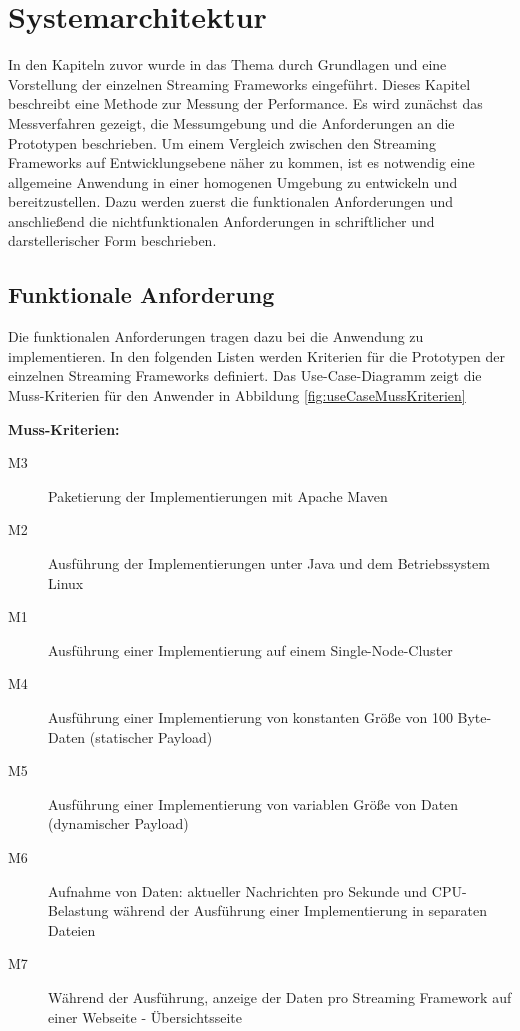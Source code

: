 \chapter{Systemarchitektur}
\label{chapter:systemarchitekur}

In den Kapiteln zuvor wurde in das Thema durch Grundlagen und eine Vorstellung der einzelnen Streaming Frameworks eingeführt. Dieses Kapitel beschreibt eine Methode zur Messung der Performance. Es wird zunächst das Messverfahren gezeigt, die Messumgebung und die Anforderungen an die Prototypen beschrieben. Um einem Vergleich zwischen den Streaming Frameworks auf Entwicklungsebene näher zu kommen, ist es notwendig eine allgemeine Anwendung in einer homogenen Umgebung zu entwickeln und bereitzustellen. Dazu werden zuerst die funktionalen Anforderungen und anschließend die nichtfunktionalen Anforderungen in schriftlicher und darstellerischer Form beschrieben.

\section{Funktionale Anforderung}
\label{sec:funktAnforderung}
Die funktionalen Anforderungen tragen dazu bei die Anwendung zu implementieren. In den folgenden Listen werden Kriterien für die Prototypen der einzelnen Streaming Frameworks definiert. Das Use-Case-Diagramm zeigt die Muss-Kriterien für den Anwender in Abbildung \ref{fig:useCaseMussKriterien}

\textbf{Muss-Kriterien:}
\begin{description}
  \item[M3] Paketierung der Implementierungen mit Apache Maven	
	\item[M2] Ausführung der Implementierungen unter Java und dem Betriebssystem Linux
	\item[M1] Ausführung einer Implementierung auf einem Single-Node-Cluster	
	\item[M4] Ausführung einer Implementierung von konstanten Größe von 100 Byte-Daten (statischer Payload)
	\item[M5] Ausführung einer Implementierung von variablen Größe von Daten (dynamischer Payload)
	\item[M6] Aufnahme von Daten: aktueller Nachrichten pro Sekunde und CPU-Belastung während der Ausführung einer Implementierung in  separaten Dateien 
	\item[M7] Während der Ausführung, anzeige der Daten pro Streaming Framework auf einer Webseite - Übersichtsseite
\end{description}

